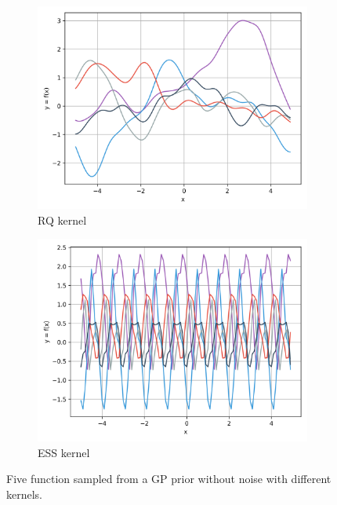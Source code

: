 \documentclass{article}
\begin{document}
\begin{figure}[ht]
\begin{subfigure}{.245\textwidth}
    \includegraphics[width=\linewidth]{kernels/prior/noise-free/kernelRQ.png}
    \caption{RQ kernel}
    \label{fig:priorRQ}
  \end{subfigure}
  \begin{subfigure}{.245\textwidth}
    \centering
    \includegraphics[width=\linewidth]{kernels/prior/noise-free/kernelESS.png}
    \caption{ESS kernel}
    \label{fig:priorESS}
  \end{subfigure}
  \caption{Five function sampled from a GP prior without noise with different kernels.}
  \label{fig:priors}
\end{figure}
\end{document}
